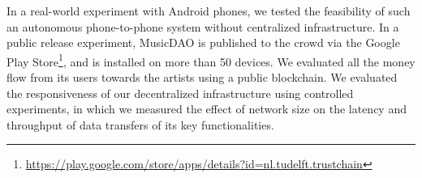 In a real-world experiment with Android phones, we tested the feasibility of such an autonomous phone-to-phone system without centralized infrastructure. In a public release experiment, MusicDAO is published to the crowd via the Google Play Store\footnote{\url{https://play.google.com/store/apps/details?id=nl.tudelft.trustchain}}, and is installed on more than 50 devices. We evaluated all the money flow from its users towards the artists using a public blockchain. We evaluated the responsiveness of our decentralized infrastructure using controlled experiments, in which we measured the effect of network size on the latency and throughput of data transfers of its key functionalities.

